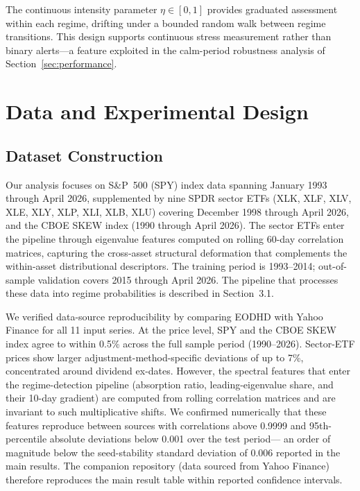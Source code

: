 \documentclass[11pt]{article}
\begin{document}
The continuous intensity parameter $\eta \in [0,1]$ provides graduated
assessment within each regime, drifting under a bounded random walk
between regime transitions. This design supports continuous stress
measurement rather than binary alerts---a feature exploited in the
calm-period robustness analysis of Section~\ref{sec:performance}.

\section{Data and Experimental Design}

\subsection{Dataset Construction}

Our analysis focuses on S\&P~500 (SPY) index data spanning January 1993
through April 2026, supplemented by nine SPDR sector ETFs (XLK, XLF, XLV,
XLE, XLY, XLP, XLI, XLB, XLU) covering December 1998 through April 2026,
and the CBOE SKEW index (1990 through April 2026). The sector ETFs enter
the pipeline through eigenvalue features computed on rolling 60-day
correlation matrices, capturing the cross-asset structural deformation
that complements the within-asset distributional descriptors. The
training period is 1993--2014; out-of-sample validation covers 2015
through April 2026. The pipeline that processes these data into regime
probabilities is described in Section~3.1.

We verified data-source reproducibility by comparing EODHD with Yahoo
Finance for all 11 input series. At the price level, SPY and the CBOE
SKEW index agree to within 0.5\% across the full sample period
(1990--2026). Sector-ETF prices show larger adjustment-method-specific
deviations of up to 7\%, concentrated around dividend ex-dates. However,
the spectral features that enter the regime-detection pipeline
(absorption ratio, leading-eigenvalue share, and their 10-day gradient)
are computed from rolling correlation matrices and are invariant to such
multiplicative shifts. We confirmed numerically that these features
reproduce between sources with correlations above 0.9999 and
95th-percentile absolute deviations below 0.001 over the test period---
an order of magnitude below the seed-stability standard deviation of
0.006 reported in the main results. The companion repository (data
sourced from Yahoo Finance) therefore reproduces the main result table
within reported confidence intervals.
\end{document}
